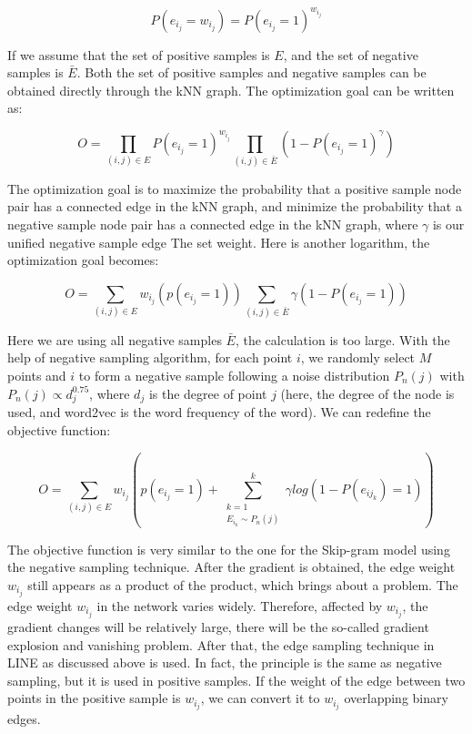 \begin{equation*}
    P(e_i_j = w_i_j) = P(e_i_j = 1) ^ {w_i_j}
\end{equation*}

\noindent If we assume that the set of positive samples is $E$, and the set of negative samples is $\bar E$. Both the set of positive samples and negative samples can be obtained directly through the kNN graph. The optimization goal can be written as:

\begin{equation*}
    O = \prod_{(i,j)∈E} P(e_i_j = 1) ^ {w_i_j} \prod_{(i,j)∈\bar E} (1 - P(e_i_j = 1) ^ {\gamma}) 
\end{equation*}

\noindent The optimization goal is to maximize the probability that a positive sample node pair has a connected edge in the kNN graph, and minimize the probability that a negative sample node pair has a connected edge in the kNN graph, where $\gamma$ is our unified negative sample edge The set weight. Here is another logarithm, the optimization goal becomes:

\begin{equation*}
    O =  \sum_{(i,j)∈E}  w_i_j(p(e_i_j = 1)) \sum_{(i,j)∈\bar E} \gamma (1 - P(e_i_j = 1))
\end{equation*}

\noindent Here we are using all negative samples $\bar E$, the calculation is too large. With the help of negative sampling algorithm, for each point $i$, we randomly select $M$ points and $i$ to form a negative sample following a noise distribution $P_n(j)$ with $P_n(j)∝d_j^{0. 75}$, where $d_j$ is the degree of point $j$ (here, the degree of the node is used, and word2vec is the word frequency of the word). We can redefine the objective function:

\begin{equation*}
    O =  \sum_{(i,j)∈E}  w_i_j(p(e_i_j = 1)  +\sum^k_{\substack{k=1\\ {E_{i_k} \sim P_n(j)}}} \gamma log (1 - P(e_{ij_{k}}) = 1))
\end{equation*}

\noindent The objective function is very similar to the one for the Skip-gram model using the negative sampling technique. After the gradient is obtained, the edge weight $w_i_j$ still appears as a product of the product, which brings about a problem. The edge weight $w_i_j$ in the network varies widely. Therefore, affected by $w_i_j$, the gradient changes will be relatively large, there will be the so-called gradient explosion and vanishing problem. After that, the edge sampling technique in LINE as discussed above is used. In fact, the principle is the same as negative sampling, but it is used in positive samples. If the weight of the edge between two points in the positive sample is $w_i_j$, we can convert it to $w_i_j$ overlapping binary edges.\\


